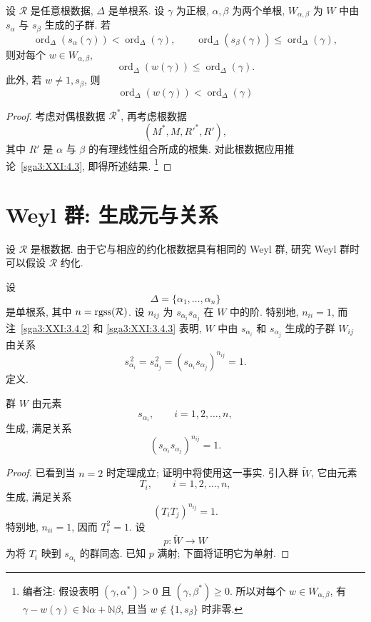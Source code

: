 \begin{corollary}\label{sga3:XXI:4.4}
设 \(\mathcal{R}\) 是任意根数据, \(\Delta\) 是单根系. 设 \(\gamma\) 为正根, \(\alpha,\beta\) 为两个单根, \(W_{\alpha,\beta}\) 为 \(W\) 中由 \(s_\alpha\) 与 \(s_\beta\) 生成的子群. 若
\[
 \operatorname{ord}_\Delta(s_\alpha(\gamma))
 <\operatorname{ord}_\Delta(\gamma),
 \qquad
 \operatorname{ord}_\Delta(s_\beta(\gamma))
 \le\operatorname{ord}_\Delta(\gamma),
\]
则对每个 \(w\in W_{\alpha,\beta}\),
\[
 \operatorname{ord}_\Delta(w(\gamma))
 \le\operatorname{ord}_\Delta(\gamma).
\]
此外, 若 \(w\ne1,s_\beta\), 则
\[
 \operatorname{ord}_\Delta(w(\gamma))
 <\operatorname{ord}_\Delta(\gamma)
\]
\end{corollary}
\begin{proof}
考虑对偶根数据 \(\mathcal{R}^\ast\), 再考虑根数据
\[
 (M^\ast,M,R'^\ast,R'),
\]
其中 \(R'\) 是 \(\alpha\) 与 \(\beta\) 的有理线性组合所成的根集. 对此根数据应用推论~\ref{sga3:XXI:4.3}, 即得所述结果.
\footnote{编者注: 假设表明 \((\gamma,\alpha^\ast)>0\) 且 \((\gamma,\beta^\ast)\ge0\). 所以对每个 \(w\in W_{\alpha,\beta}\), 有 \(\gamma-w(\gamma)\in\mathbb N\alpha+\mathbb N\beta\), 且当 \(w\notin\{1,s_\beta\}\) 时非零.}
\end{proof}

\section{Weyl 群: 生成元与关系}
\label{sga3:XXI:5}
\setcounter{theorem}{0}
设 \(\mathcal{R}\) 是根数据. 由于它与相应的约化根数据具有相同的 Weyl 群, 研究 Weyl 群时可以假设 \(\mathcal{R}\) 约化.

设
\[
 \Delta=\{\alpha_1,\ldots,\alpha_n\}
\]
是单根系, 其中 \(n=\operatorname{rgss}(\mathcal{R})\). 设 \(n_{ij}\) 为 \(s_{\alpha_i}s_{\alpha_j}\) 在 \(W\) 中的阶. 特别地, \(n_{ii}=1\), 而注~\ref{sga3:XXI:3.4.2} 和 \ref{sga3:XXI:3.4.3} 表明, \(W\) 中由 \(s_{\alpha_i}\) 和 \(s_{\alpha_j}\) 生成的子群 \(W_{ij}\) 由关系
\[
 s_{\alpha_i}^{\,2}=s_{\alpha_j}^{\,2}
 =(s_{\alpha_i}s_{\alpha_j})^{n_{ij}}=1.
\]
定义.

\begin{theorem}\label{sga3:XXI:5.1}
群 \(W\) 由元素
\[
 s_{\alpha_i},\qquad i=1,2,\ldots,n,
\]
生成, 满足关系
\[
 (s_{\alpha_i}s_{\alpha_j})^{n_{ij}}=1.
\]
\end{theorem}
\begin{proof}
已看到当 \(n=2\) 时定理成立; 证明中将使用这一事实. 引入群 \(\widetilde W\), 它由元素
\[
 T_i,\qquad i=1,2,\ldots,n,
\]
生成, 满足关系
\[
 (T_iT_j)^{n_{ij}}=1.
\]
特别地, \(n_{ii}=1\), 因而 \(T_i^2=1\). 设
\[
 p:\widetilde W\longrightarrow W
\]
为将 \(T_i\) 映到 \(s_{\alpha_i}\) 的群同态. 已知 \(p\) 满射; 下面将证明它为单射.
\end{proof}

